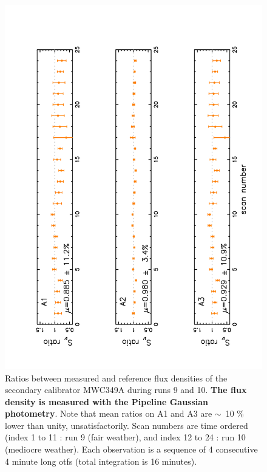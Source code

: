 \begin{figure}[p]
\begin{center}
  \includegraphics[clip, angle=-90, scale=0.6]{Figures/Ratio_vs_index_MWC349_r9_r10_NK.pdf}
  \caption[Fixed-Gaussian flux density stability checks on secondary calibrators] {Ratios between measured and reference flux densities of  the secondary calibrator  MWC349A 
    during runs 9 and 10.  {\bf The flux density is measured with the Pipeline Gaussian photometry}. Note that mean ratios 
    on A1 and A3 are $\sim$~10 \% lower than unity, unsatisfactorily.
    Scan numbers are time ordered (index 1 to 11 : run 9 (fair weather), and index 12 to 24 : run 10 (mediocre weather).
    Each observation is a sequence of 4 consecutive 4 minute long otfs (total integration is 16 minutes).
  }
\label{fig:ratio_349_NK}
\end{center}
\end{figure}




